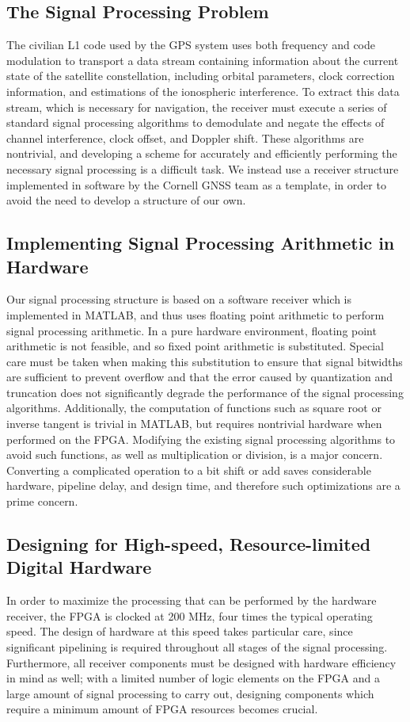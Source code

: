 \documentclass[14pt]{article}
\begin{document}
\subsection*{The Signal Processing Problem}
The civilian L1 code used by the GPS system uses both frequency and code modulation to transport a data
stream containing information about the current state of the satellite constellation, including orbital
parameters, clock correction information, and estimations of the ionospheric interference.  To extract
this data stream, which is necessary for navigation, the receiver must execute a series of standard
signal processing algorithms to demodulate and negate the effects of channel interference, clock offset,
and Doppler shift.  These algorithms are nontrivial, and developing a scheme for accurately and
efficiently performing the necessary signal processing is a difficult task.  We instead use a receiver
structure implemented in software by the Cornell GNSS team as a template, in order to avoid the need to
develop a structure of our own.

\subsection*{Implementing Signal Processing Arithmetic in Hardware}
Our signal processing structure is based on a software receiver which is implemented in MATLAB, and thus
uses floating point arithmetic to perform signal processing arithmetic.  In a pure hardware environment,
floating point arithmetic is not feasible, and so fixed point arithmetic is substituted.  Special care
must be taken when making this substitution to ensure that signal bitwidths are sufficient to prevent
overflow and that the error caused by quantization and truncation does not significantly degrade the
performance of the signal processing algorithms.  Additionally, the computation of functions such as
square root or inverse tangent is trivial in MATLAB, but requires nontrivial hardware when performed on
the FPGA.  Modifying the existing signal processing algorithms to avoid such functions, as well as
multiplication or division, is a major concern.  Converting a complicated operation to a bit shift or
add saves considerable hardware, pipeline delay, and design time, and therefore such optimizations are a
prime concern.

\subsection*{Designing for High-speed, Resource-limited Digital Hardware}
In order to maximize the processing that can be performed by the hardware receiver, the FPGA is clocked
at 200 MHz, four times the typical operating speed.  The design of hardware at this speed takes
particular care, since significant pipelining is required throughout all stages of the signal
processing.  Furthermore, all receiver components must be designed with hardware efficiency in mind as
well; with a limited number of logic elements on the FPGA and a large amount of signal processing to
carry out, designing components which require a minimum amount of FPGA resources becomes crucial.
\end{document}
